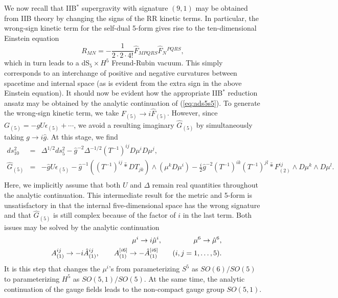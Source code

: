 \documentclass[a4paper,12pt]{article}
\begin{document}
We now recall that IIB$^*$ supergravity with signature $(9,1)$ may be
obtained from IIB theory by changing the signs of the RR kinetic terms.
In particular, the wrong-sign kinetic term for the self-dual 5-form
gives rise to the ten-dimensional Einstein equation
%
\begin{equation}
R_{MN}=-\frac{1}{2\cdot2\cdot4!}\hat F_{MPQRS}\hat F_N{}^{PQRS},
\end{equation}
%
which in turn leads to a dS$_5\times H^5$ Freund-Rubin vacuum.  This simply
corresponds to an interchange of positive and negative curvatures
between spacetime and internal space (as is evident from the extra sign in
the above Einstein equation).  It should now be evident how the
appropriate IIB$^*$ reduction ansatz may be obtained by the analytic
continuation of (\ref{eq:ads5s5}).  To generate the wrong-sign kinetic
term, we take $F_{(5)}\to i\hat F_{(5)}$.  However, since
$G_{(5)}=-gU\epsilon_{(5)}+\cdots$, we avoid a resulting imaginary
$\hat G_{(5)}$ by simultaneously taking $g\to i\hat g$.  At this stage,
we find
%
\begin{eqnarray}
ds_{10}^2&=&\Delta^{1/2}ds_5^2-\hat g^{-2}\Delta^{-1/2}(T^{-1})^{ij}
D\mu^iD\mu^j,\nonumber\\
\hat G_{(5)}&=&-\hat gU\epsilon_{(5)}-\hat g^{-1}((T^{-1})^{ij}
\bar{\ast}DT_{jk}) \wedge(\mu^kD\mu^i)
-\frac{i}{2}\hat g^{-2}(T^{-1})^{ik}(T^{-1})^{jl}\bar{\ast} F^{ij}_{(2)}
\wedge D\mu^k \wedge D\mu^l.\nonumber\\
\end{eqnarray}
%
Here, we implicitly assume that both $U$ and $\Delta$ remain real
quantities throughout the analytic continuation.  This intermediate
result for the metric and 5-form is unsatisfactory in that the internal
five-dimensional space has the wrong signature and that $\hat G_{(5)}$ is
still complex because of the factor of $i$ in the last term.  Both
issues may be solved by the analytic continuation
%
\begin{eqnarray}
&&\mu^i\to i\hat \mu^i,\qquad\hphantom{A-A}\!\!\mu^6\to\hat\mu^6,\nonumber\\
&&A_{(1)}^{ij}\to -i\hat A_{(1)}^{ij},\qquad
A_{(1)}^{[i6]}\to -\hat A_{(1)}^{[i6]}\qquad (i,j=1,\dots,5).
\end{eqnarray}
%
It is this step that changes the $\mu^i$'s from parameterizing $S^5$ as
$SO(6)/SO(5)$ to parameterizing $H^5$ as $SO(5,1)/SO(5)$.  At the same
time, the analytic continuation of the gauge fields leads to the
non-compact gauge group $SO(5,1)$.
\end{document}
